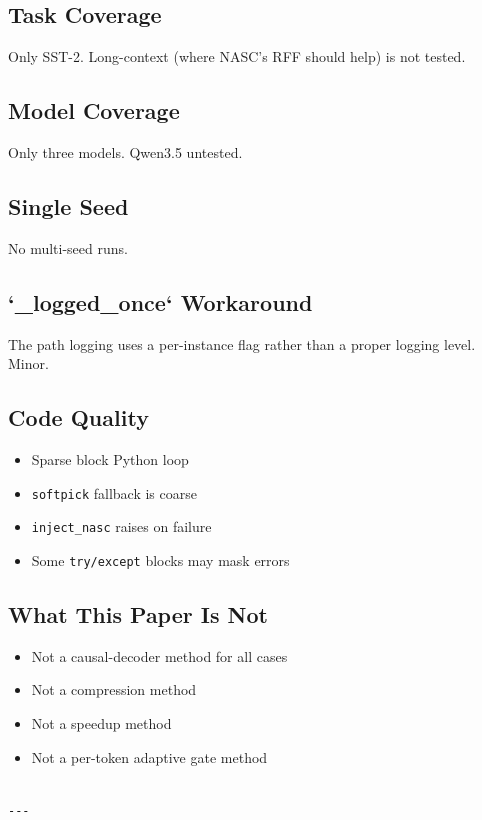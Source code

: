 \subsection{Task Coverage}

Only SST-2. Long-context (where NASC's RFF should help) is not tested.

\subsection{Model Coverage}

Only three models. Qwen3.5 untested.

\subsection{Single Seed}

No multi-seed runs.

\subsection{`\_logged\_once` Workaround}

The path logging uses a per-instance flag rather than a proper logging 
level. Minor.

\subsection{Code Quality}

\begin{itemize}
\item Sparse block Python loop
\item \texttt{softpick} fallback is coarse
\item \texttt{inject\_nasc} raises on failure
\item Some \texttt{try/except} blocks may mask errors

\end{itemize}
\subsection{What This Paper Is Not}

\begin{itemize}
\item Not a causal-decoder method for all cases
\item Not a compression method
\item Not a speedup method
\item Not a per-token adaptive gate method
\end{itemize}
\begin{lstlisting}

---
\end{lstlisting}


